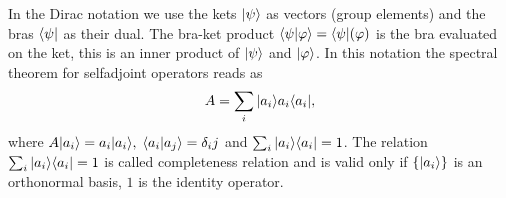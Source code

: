\documentclass[../1.tex]{subfiles}
\begin{document}
   
    In the Dirac notation we use the kets $| \psi \rangle$ as vectors (group elements) and the bras $\langle \psi |$ as their dual.
    The bra-ket product $\langle \psi | \varphi \rangle = \langle \psi |(\varphi)$ is the bra evaluated on the ket,
    this is an inner product of $| \psi \rangle$ and $| \varphi \rangle$.
    In this notation the spectral theorem for selfadjoint operators reads as
    \[ A = \sum_i | a_i \rangle a_i\langle a_i |, \]
    where $A | a_i \rangle = a_i | a_i \rangle, \; \langle a_i | a_j \rangle = \delta_ij$ and $\sum_i | a_i \rangle \langle a_i | = 1$.
    The relation $\sum_i | a_i \rangle \langle a_i | = 1$ is called completeness relation and
    is valid only if $\{ | a_i \rangle\}$ is an orthonormal basis, $1$ is the identity operator.
\end{document}
